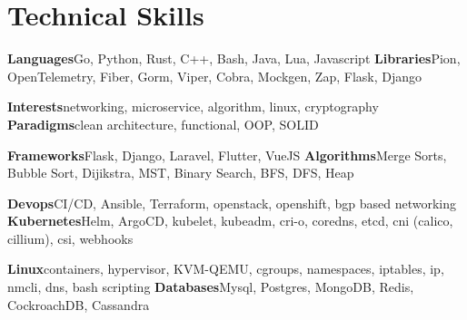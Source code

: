 \section{Technical Skills}

\cvdoubleitem
  {\textbf{Languages}}{Go, Python, Rust, C++, Bash, Java, Lua, Javascript}
  {\textbf{Libraries}}{Pion, OpenTelemetry, Fiber, Gorm, Viper, Cobra, Mockgen, Zap, Flask, Django}

\cvdoubleitem
  {\textbf{Interests}}{networking, microservice, algorithm, linux, cryptography}
  {\textbf{Paradigms}}{clean architecture, functional, OOP, SOLID}

\cvdoubleitem
  {\textbf{Frameworks}}{Flask, Django, Laravel, Flutter, VueJS}
  {\textbf{Algorithms}}{Merge Sorts, Bubble Sort, Dijikstra, MST, Binary Search, BFS, DFS, Heap}

\cvdoubleitem
  {\textbf{Devops}}{CI/CD, Ansible, Terraform, openstack, openshift, bgp based networking}
  {\textbf{Kubernetes}}{Helm, ArgoCD, kubelet, kubeadm, cri-o, coredns, etcd, cni (calico, cillium), csi, webhooks}

\cvdoubleitem
  {\textbf{Linux}}{containers, hypervisor, KVM-QEMU, cgroups, namespaces, iptables, ip, nmcli, dns, bash scripting}
  {\textbf{Databases}}{Mysql, Postgres, MongoDB, Redis, CockroachDB, Cassandra}
